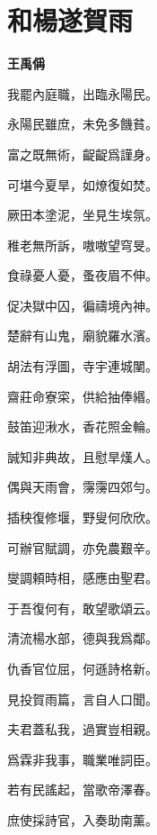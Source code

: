 \documentclass[12pt,a4paper]{ctexbook}
\begin{document}
\section{和楊遂賀雨}
\textbf{王禹偁}\par\vspace{0.5em}
我罷內庭職，出臨永陽民。\par
永陽民雖庶，未免多饑貧。\par
富之既無術，齪齪爲謹身。\par
可堪今夏旱，如燎復如焚。\par
厥田本塗泥，坐見生埃氛。\par
稚老無所訴，嗷嗷望穹旻。\par
食祿憂人憂，蚤夜眉不伸。\par
促决獄中囚，徧禱境內神。\par
楚辭有山鬼，廟貌羅水濱。\par
胡法有浮圖，寺宇連城闉。\par
齋莊命寮寀，供給抽俸緡。\par
鼓笛迎湫水，香花照金輪。\par
誠知非典故，且慰旱熯人。\par
偶與天雨會，霶霶四郊勻。\par
插秧復修堰，野叟何欣欣。\par
可辦官賦調，亦免農艱辛。\par
燮調頼時相，感應由聖君。\par
于吾復何有，敢望歌頌云。\par
清流楊水部，德與我爲鄰。\par
仇香官位屈，何遜詩格新。\par
見投賀雨篇，言自人口聞。\par
夫君蓋私我，過實豈相親。\par
爲霖非我事，職業唯詞臣。\par
若有民謠起，當歌帝澤春。\par
庶使採詩官，入奏助南薰。\par
\end{document}
